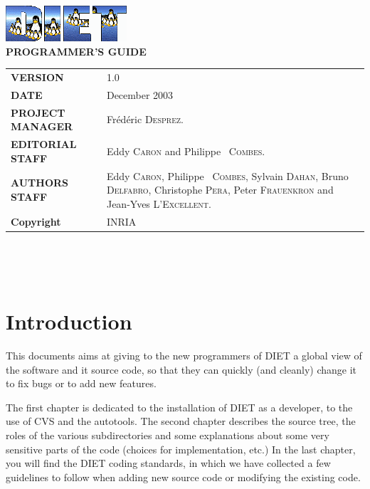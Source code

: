 \documentclass[11pt,a4paper]{report}
\begin{document}

\thispagestyle{empty}
\vspace*{3cm}
\vspace*{3cm}

\begin{center}
\includegraphics[scale=.5]{fig/logo_DIET}\\[2ex]
\textbf{\Huge PROGRAMMER'S GUIDE\\[2ex]}
\end{center}

\vfill


\noindent
\small{
\begin{tabular}{ll}
  \textbf{VERSION}  & 1.0\\
  \textbf{DATE}     & December 2003\\
  \textbf{PROJECT MANAGER}  & Fr\'ed\'eric \textsc{Desprez}.\\
  \textbf{EDITORIAL STAFF}  & Eddy \textsc{Caron} and Philippe ~\textsc{Combes}.\\
  \textbf{AUTHORS STAFF}    & 
\begin{minipage}[t]{12cm}
  Eddy \textsc{Caron}, Philippe ~\textsc{Combes}, Sylvain \textsc{Dahan}, Bruno \textsc{Delfabro}, Christophe \textsc{Pera}, Peter \textsc{Frauenkron} and Jean-Yves \textsc{L'Excellent}.
\end{minipage} \\
  \textbf{Copyright}& INRIA
\end{tabular}\\
}

\newpage
\thispagestyle{empty}
\ 


\newpage
\tableofcontents


\sloppy

%
%
\newpage
{}
\chapter*{Introduction}

This documents aims at giving to the new programmers of DIET a global
view of the software and it source code, so that they can quickly (and
cleanly) change it to fix bugs or to add new features.

The first chapter is dedicated to the installation of DIET as a
developer, to the use of CVS and the autotools.  The second chapter
describes the source tree, the roles of the various subdirectories and
some explanations about some very sensitive parts of the code (choices
for implementation, etc.)  In the last chapter, you will find the DIET
coding standards, in which we have collected a few guidelines to
follow when adding new source code or modifying the existing code.
\end{document}
